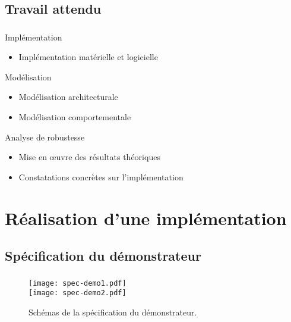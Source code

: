 \documentclass{beamer}
\begin{document}
    \subsection{Travail attendu}
      \begin{frame}
        \frametitle{\secname}
        \framesubtitle{\subsecname}

        \begin{block}{Implémentation}
          \begin{itemize}
            \item Implémentation matérielle et logicielle
          \end{itemize}
        \end{block}

        \pause
        \begin{block}{Modélisation}
          \begin{itemize}
            \item Modélisation architecturale
            \item Modélisation comportementale
          \end{itemize}
        \end{block}

        \pause
        \begin{block}{Analyse de robustesse}
          \begin{itemize}
            \item Mise en \oe uvre des résultats théoriques
            \item Constatations concrètes sur l'implémentation
          \end{itemize}
        \end{block}
      \end{frame}

  \section{Réalisation d'une implémentation}
    \subsection{Spécification du démonstrateur}
      \begin{frame}
        \frametitle{\secname}
        \framesubtitle{\subsecname}
       
        \vfill
        \begin{figure}
          \centering
          \texttt{[image: spec-demo1.pdf]} \\
          \texttt{[image: spec-demo2.pdf]}
          \caption{{\footnotesize\cite{bechennec12}} Schémas de la spécification
            du démonstrateur.}
        \end{figure}
      \end{frame}
\end{document}
